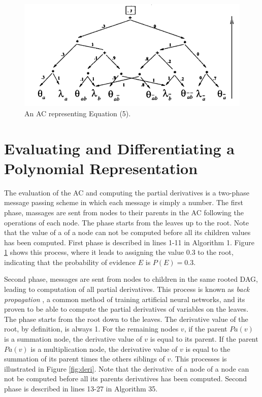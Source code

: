 \documentclass[twoside,11pt]{article}
\begin{document}
\begin{figure}[!htb]
    \begin{center}
    	\includegraphics[width=\columnwidth]{figures/compiled.png}
		\caption{An AC representing Equation (5).}
		\label{fig:comp}
    \end{center}
\end{figure}


\section{Evaluating and Differentiating a Polynomial Representation}
\label{sec:eval}

The evaluation of the AC and computing the partial derivatives is a two-phase message passing scheme in which each message is simply a number.
The first phase, massages are sent from nodes to their parents in the AC following the operations of each node.
The phase starts from the leaves up to the root.
Note that the value of a of a node can not be computed before all its children values has been computed.
First phase is described in lines 1-11 in Algorithm 1.
Figure \ref{fig:comp} shows this process, where it leads to assigning the value 0.3 to the root, indicating that the probability of evidence $E$ is $P(E) = 0.3$.

Second phase, messages are sent from nodes to children in the same rooted DAG, leading to computation of all partial derivatives.
This process is known as \emph{back propagation} \cite{rumelhart1988learning}, a common method of training artificial neural networks, and its proven to be able to compute the partial derivatives of variables on the leaves.
The phase starts from the root down to the leaves.
The derivative value of the root, by definition, is always 1.
For the remaining nodes $v$, if the parent $Pa(v)$ is a summation node, the derivative value of $v$ is equal to its parent.
If the parent $Pa(v)$ is a multiplication node, the derivative value of $v$ is equal to the summation of its parent times the others siblings of $v$.
This processes is illustrated in Figure \ref{fig:deri}.
Note that the derivative of a node of a node can not be computed before all its parents derivatives has been computed.
Second phase is described in lines 13-27 in Algorithm 35.
\end{document}
